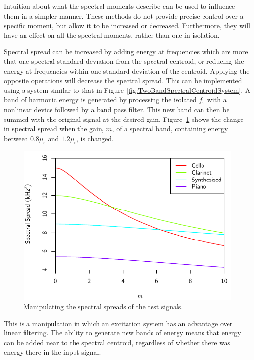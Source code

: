			Intuition about what the spectral moments describe can be used to influence them in a simpler
			manner. These methods do not provide precise control over a specific moment, but allow it to be
			increased or decreased.  Furthermore, they will have an effect on all the spectral moments, rather
			than one in isolation. 
			
			Spectral spread can be increased by adding energy at frequencies which are more that one spectral
			standard deviation from the spectral centroid, or reducing the energy at frequencies within one
			standard deviation of the centroid. Applying the opposite operations will decrease the spectral
			spread. This can be implemented using a system similar to that in
			Figure~\ref{fig:TwoBandSpectralCentroidSystem}. A band of harmonic energy is generated by
			processing the isolated $f_{0}$ with a nonlinear device followed by a band pass filter. This new
			band can then be summed with the original signal at the desired gain. Figure~\ref{fig:MoveSpreads}
			shows the change in spectral spread when the gain, $m$, of a spectral band, containing energy
			between $0.8\mu_{\mathrm{s}}$ and $1.2\mu_{\mathrm{s}}$, is changed.

			\begin{figure}[h!]
				\centering
				\includegraphics{chapter6/Images/MoveSpreads.pdf}
				\caption{Manipulating the spectral spreads of the test signals.}
				\label{fig:MoveSpreads}
			\end{figure}

			This is a manipulation in which an excitation system has an advantage over linear filtering. The
			ability to generate new bands of energy means that energy can be added near to the spectral
			centroid, regardless of whether there was energy there in the input signal.

